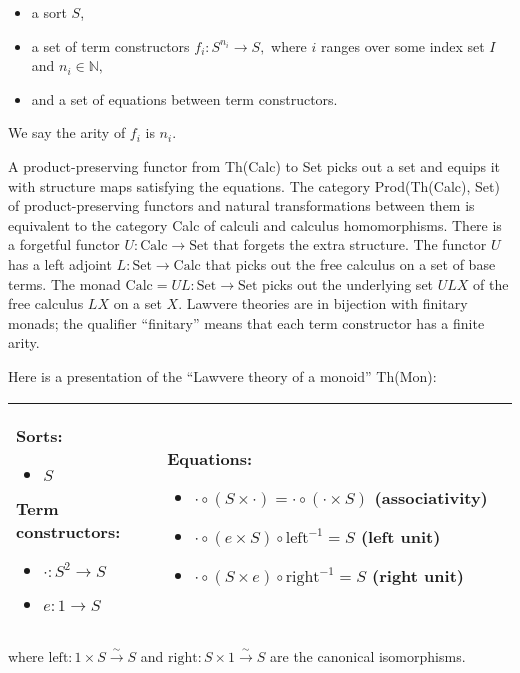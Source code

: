\documentclass{llncs}
\newcommand{\maps}{\colon}
\newcommand{\Set}{\mathrm{Set}}
\newcommand{\Calc}{\mathrm{Calc}}
\newcommand{\leftu}{\mathrm{left}}
\newcommand{\rightu}{\mathrm{right}}
\newcommand{\NN}{\mathbb{N}}
\begin{document}
\begin{itemize}
  \item a sort $S$,
  \item a set of term constructors $f_i\maps S^{n_i} \to S,$ where $i$ ranges over some index set $I$ and $n_i \in \NN,$
  \item and a set of equations between term constructors.
\end{itemize}
We say the arity of $f_i$ is $n_i.$

A product-preserving functor from Th(Calc) to Set picks out a set and equips it with structure maps satisfying the equations.  The category Prod(Th(Calc), Set) of product-preserving functors and natural transformations between them is equivalent to the category Calc of calculi and calculus homomorphisms.  There is a forgetful functor ${U\maps \Calc \to \Set}$ that forgets the extra structure.  The functor $U$ has a left adjoint ${L\maps \Set \to \Calc}$ that picks out the free calculus on a set of base terms.  The monad $\Calc = UL\maps \Set \to \Set$ picks out the underlying set $ULX$ of the free calculus $LX$ on a set $X$.  Lawvere theories are in bijection with finitary monads; the qualifier ``finitary'' means that each term constructor has a finite arity.

Here is a presentation of the ``Lawvere theory of a monoid'' Th(Mon):
\begin{center}
  \begin{tabular}{|p{0.3\linewidth}|p{0.7\linewidth}|}
    \hline
      Sorts:
      \begin{itemize}
        \item $S$
      \end{itemize}
      Term constructors:
      \begin{itemize}
        \item $\cdot\maps S^2 \to S$
        \item $e\maps 1 \to S$
      \end{itemize}
    &
      Equations:
      \begin{itemize}
        \item $\cdot \circ (S \times \cdot) = \cdot \circ (\cdot \times S)$ (associativity)
        \item $\cdot \circ (e \times S) \circ \leftu^{-1} = S$ (left unit)
        \item $\cdot \circ (S \times e) \circ \rightu^{-1} = S$ (right unit)        
      \end{itemize}\\
    \hline
  \end{tabular}
\end{center}
where ${\leftu\maps 1 \times S \stackrel{\sim}{\to} S}$ and ${\rightu\maps S \times 1 \stackrel{\sim}{\to} S}$ are the canonical isomorphisms.
\end{document}
